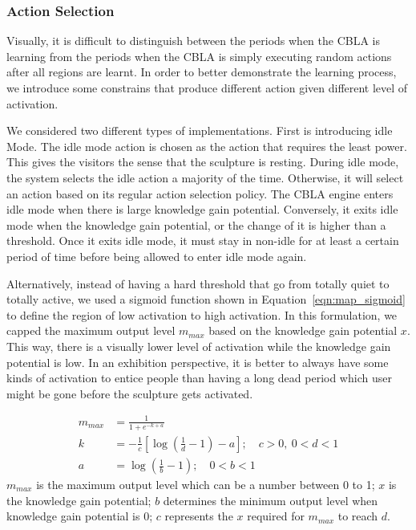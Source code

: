 \FloatBarrier 
\subsubsection{Action Selection}

Visually, it is difficult to distinguish between the periods when the CBLA is learning from the periods when the CBLA is simply executing random actions after all regions are learnt. In order to better demonstrate the learning process, we introduce some constrains that produce different action given different level of activation. 

We considered two different types of implementations. First is introducing idle Mode. The idle mode action is chosen as the action that requires the least power. This gives the visitors the sense that the sculpture is resting. During idle mode, the system selects the idle action a majority of the time. Otherwise, it will select an action based on its regular action selection policy. The CBLA engine enters idle mode when there is large knowledge gain potential. Conversely, it exits idle mode when the knowledge gain potential, or the change of it is higher than a threshold. Once it exits idle mode, it must stay in non-idle for at least a certain period of time before being allowed to enter idle mode again. 

Alternatively, instead of having a hard threshold that go from totally quiet to totally active, we used a sigmoid function shown in Equation~\eqref{eqn:map_sigmoid} to define the region of low activation to high activation. In this formulation, we capped the maximum output level $m_{max}$ based on the knowledge gain potential $x$. This way, there is a visually lower level of activation while the knowledge gain potential is low. In an exhibition perspective, it is better to always have some kinds of activation to entice people than having a long dead period which user might be gone before the sculpture gets activated.

\begin{subequations}\label{eqn:map_sigmoid}
	\begin{flalign} 
		m_{max} &= \frac{1}{1+e^{-k+a}}  \\
		k &= -\frac{1}{c}[\log{(\frac{1}{d}-1)}-a];\quad c > 0,\  0 < d < 1 \\
		a &= \log{(\frac{1}{b}-1)}; \quad 0 < b < 1
	\end{flalign}
\end{subequations}
$m_{max}$ is the maximum output level which can be a number between 0 to 1; $x$ is the knowledge gain potential; $b$ determines the minimum output level when knowledge gain potential is 0; $c$ represents the $x$ required for $m_{max}$ to reach $d$. 

